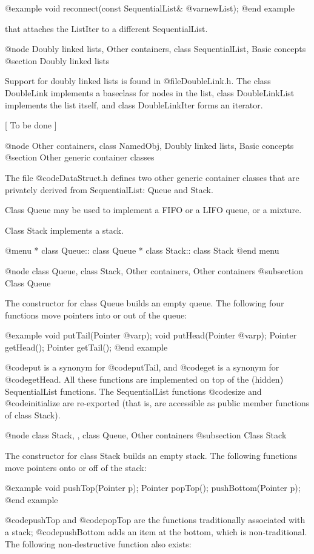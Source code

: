 @example
void reconnect(const SequentialList& @var{newList});
@end example

that attaches the ListIter to a different SequentialList.

@node Doubly linked lists, Other containers, class SequentialList, Basic concepts
@section Doubly linked lists

Support for doubly linked lists is found in @file{DoubleLink.h}.  The class
DoubleLink implements a baseclass for nodes in the list, class
DoubleLinkList implements the list itself, and class DoubleLinkIter forms an
iterator.

[ To be done ]

@node Other containers, class NamedObj, Doubly linked lists, Basic concepts
@section Other generic container classes

The file @code{DataStruct.h} defines two other generic container classes
that are privately derived from SequentialList: Queue and Stack.

Class Queue may be used to implement a FIFO or a LIFO queue, or a
mixture.

Class Stack implements a stack.

@menu
* class Queue::                 class Queue
* class Stack::                 class Stack
@end menu

@node class Queue, class Stack, Other containers, Other containers
@subsection Class Queue

The constructor for class Queue builds an empty queue.  The following
four functions move pointers into or out of the queue:

@example
void putTail(Pointer @var{p});
void putHead(Pointer @var{p});
Pointer getHead();
Pointer getTail();
@end example

@code{put} is a synonym for @code{putTail}, and @code{get} is a synonym
for @code{getHead}.  All these functions are implemented on top of the
(hidden) SequentialList functions.  The SequentialList functions
@code{size} and @code{initialize} are re-exported (that is, are
accessible as public member functions of class Stack).

@node class Stack,  , class Queue, Other containers
@subsection Class Stack

The constructor for class Stack builds an empty stack.  The following
functions move pointers onto or off of the stack:

@example
void pushTop(Pointer p);
Pointer popTop();
pushBottom(Pointer p);
@end example

@code{pushTop} and @code{popTop} are the functions traditionally
associated with a stack; @code{pushBottom} adds an item at the bottom,
which is non-traditional.  The following non-destructive function
also exists:

